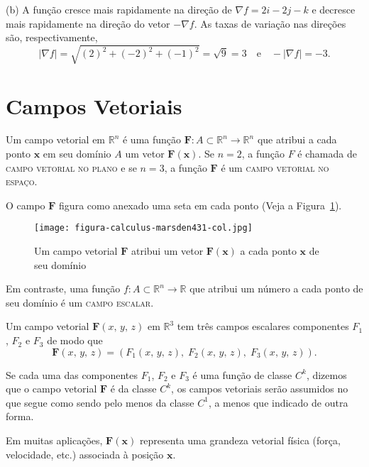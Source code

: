 (b) A função cresce mais rapidamente na direção de \( \nabla f = 2i - 2j-k\) e decresce mais rapidamente na direção
do vetor \(-\nabla f\). As taxas de variação nas direções são, respectivamente,
\begin{equation*}
	|\nabla f|=\sqrt{(2)^{2}+(-2)^{2}+(-1)^{2}}=\sqrt{9}=3 \quad \text{e} \quad -|\nabla f| =-3.
\end{equation*}

%
\section{Campos Vetoriais}
%

Um \textsf{campo vetorial} em \(\mathbb{R}^{n}\) é uma função \(\mathbf{F} \colon  A \subset \mathbb{R}^{n} \to  \mathbb{R}^{n}\) que atribui a cada
ponto \(\mathbf{x}\) em seu domínio \(A\) um vetor \(\mathbf{F}(\mathbf{x})\).  Se \(n = 2\), a função \(F\) é chamada de \textsc{campo vetorial no
	plano} e se \(n = 3\), a função \(\mathbf{F}\) é um \textsc{campo vetorial no espaço}.

O campo \(\mathbf{F}\) figura como anexado uma seta em cada ponto (Veja a Figura~\ref{fig:4-3-1}).
\begin{figure}[h]
	\centering
	\texttt{[image: figura-calculus-marsden431-col.jpg]}
	\caption{Um campo vetorial \(\mathbf{F}\) atribui um vetor \(\mathbf{F}(\mathbf{x})\) a cada ponto \(\mathbf{x}\) de seu domínio }\label{fig:4-3-1}
\end{figure}

Em contraste, uma função \(f \colon  A \subset  \mathbb{R}^{n} \to \mathbb{R}\) que atribui um número a cada ponto de seu domínio é um \textsc{campo
	escalar}.

Um campo vetorial \(\mathbf{F}(x,\, y,\, z) \) em \(\mathbb{R}^{3} \)  tem \textsf{três campos escalares} componentes \(F_{1}\),  \(F_{2}\) e \(F_{3}\) de modo
que
\begin{equation*}
	\mathbf{F}(x,\, y,\, z) =\left(F_{1} (x, \, y,\,  z),\; F_{2} (x, \, y,\,  z),\;  F_{3} (x,\,  y,\,  z)\right).
\end{equation*}

Se cada uma das componentes \(F_{1}\), \(F_{2}\) e \(F_{3}\) é uma função de classe \(C^{k}\), dizemos que o campo vetorial \(\mathbf{F}\) é da classe \(C^{k}\), os campos vetoriais serão assumidos no que segue como sendo pelo menos da classe \(C^{1}\), a menos que indicado de outra forma.

Em muitas aplicações, \(\mathbf{F}(\mathbf{x})\) representa uma grandeza vetorial física (força, velocidade, etc.) associada à posição \(\mathbf{x}\).

